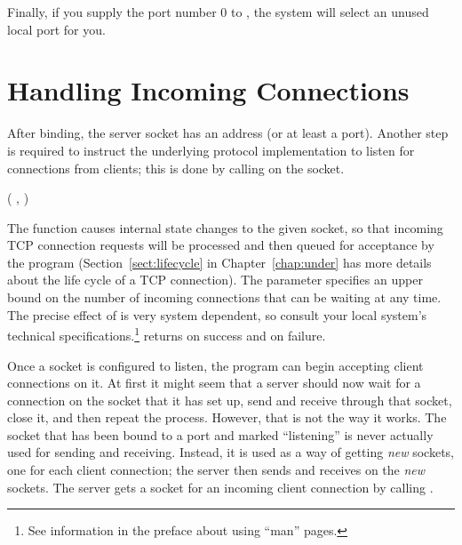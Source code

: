 Finally, if you supply the port number 0 to , the
system will select an unused local port for you.


\section{Handling Incoming Connections}
\label{sect:handlingIncomingConnections}

After binding, the server socket has an address (or at least a
port).  Another step is required to
instruct the underlying protocol implementation to listen for 
connections from clients; this is done by calling 
on the socket.

\begin{inlinefcn}
 ( , 
 )
\end{inlinefcn}

The  function causes internal state changes to the
given socket, so that incoming TCP connection requests will be processed
and then queued for acceptance by the program
(Section~\ref{sect:lifecycle} in Chapter~\ref{chap:under} has more
details about the life cycle of a TCP connection).  The 
parameter specifies an upper bound on the number of incoming
connections that can be waiting at any time. The precise
effect of  is very system dependent, so consult your
local system's technical specifications.\footnote{See information in
  the preface about using ``man'' pages.}   returns
 on success and  on failure.

Once a socket is configured to listen, the program can begin accepting client
connections on it.  At first it might seem that a server should now wait for a
connection on the socket that it has set up, send and receive through that
socket, close it, and then repeat the process.  However, that is not
the way it works.  The socket that has been bound to a port and marked
``listening'' is never actually used for sending and receiving.
Instead, it is used as a way of getting \emph{new} sockets, one for
each client connection; the server then sends and receives on the
\emph{new} sockets.  The server gets a socket for an incoming client
connection by calling .

